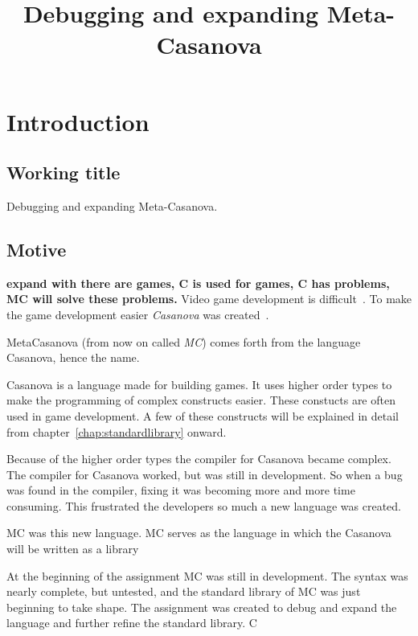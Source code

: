 



\title{Debugging and expanding Meta-Casanova}
\author{\writer}

\begin{titlepage}
   
\end{titlepage}

\begin{abstract}
\end{abstract}

\section{Introduction}
\subsection{Working title}
Debugging and expanding Meta-Casanova.

\subsection{Motive}
\textbf{expand with there are games, C is used for games, C has problems, MC will solve these problems.}
Video game development is difficult~\cite{blow2004game}.
To make the game development easier \emph{Casanova} was created~\cite{}.

MetaCasanova (from now on called \emph{MC}) comes forth from the language Casanova, hence the name.

Casanova is a language made for building games.
It uses higher order types to make the programming of complex constructs easier.
These constucts are often used in game development.
A few of these constructs will be explained in detail from chapter~\ref{chap:standardlibrary} onward.

Because of the higher order types the compiler for Casanova became complex.
The compiler for Casanova worked, but was still in development.
So when a bug was found in the compiler, fixing it was becoming more and more time consuming.
This frustrated the developers so much a new language was created.

MC was this new language.
MC serves as the language in which the Casanova will be written as a library

At the beginning of the assignment MC was still in development.
The syntax was nearly complete, but untested, and the standard library of MC was just beginning to take shape.
The assignment was created to debug and expand the language and further refine the standard library.
C




\begin{appendices}
   
\end{appendices}

